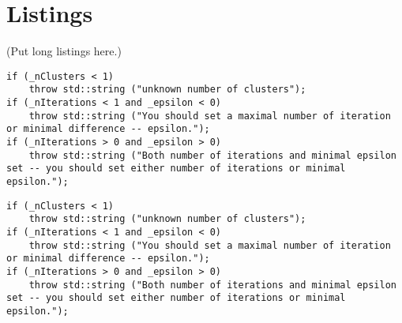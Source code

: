 \chapter{Listings}

(Put long listings here.)

\begin{lstlisting}
if (_nClusters < 1)
	throw std::string ("unknown number of clusters");
if (_nIterations < 1 and _epsilon < 0)
	throw std::string ("You should set a maximal number of iteration or minimal difference -- epsilon.");
if (_nIterations > 0 and _epsilon > 0)
	throw std::string ("Both number of iterations and minimal epsilon set -- you should set either number of iterations or minimal epsilon.");
\end{lstlisting}


\begin{verbatim}
if (_nClusters < 1)
	throw std::string ("unknown number of clusters");
if (_nIterations < 1 and _epsilon < 0)
	throw std::string ("You should set a maximal number of iteration or minimal difference -- epsilon.");
if (_nIterations > 0 and _epsilon > 0)
	throw std::string ("Both number of iterations and minimal epsilon set -- you should set either number of iterations or minimal epsilon.");
\end{verbatim} 